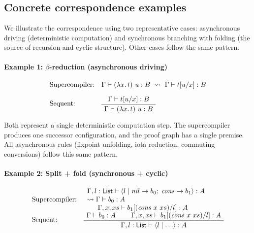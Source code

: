 \subsection{Concrete correspondence examples}
\label{sec:sc-examples}

We illustrate the correspondence using two representative cases: asynchronous driving (deterministic computation) and synchronous branching with folding (the source of recursion and cyclic structure). Other cases follow the same pattern.

\paragraph{Example 1: $\beta$-reduction (asynchronous driving)}

\[
\begin{array}{ll}
\text{Supercompiler:} & \Gamma \vdash (\lambda x.\,t)~u : B \;\leadsto\; \Gamma \vdash t[u/x] : B \\[1em]
\text{Sequent:} &
\AxiomC{$\Gamma \vdash t[u/x] : B$}
\UnaryInfC{$\Gamma \vdash (\lambda x.\,t)~u : B$}
\DisplayProof
\end{array}
\]

Both represent a single deterministic computation step. The supercompiler produces one successor configuration, and the proof graph has a single premise. All asynchronous rules (fixpoint unfolding, iota reduction, commuting conversions) follow this same pattern.

\paragraph{Example 2: Split + fold (synchronous + cyclic)}

\[
\begin{array}{ll}
\text{Supercompiler:} &
\begin{array}{l}
\Gamma, l : \mathsf{List} \vdash \langle l \mid \mathit{nil}\to b_0;\; \mathit{cons}\to b_1 \rangle : A \\
\leadsto \Gamma \vdash b_0 : A \\
\phantom{\leadsto}\;\; \Gamma, x, xs \vdash b_1[(\mathit{cons}~x~xs)/l] : A
\end{array} \\[1em]
\text{Sequent:} &
\AxiomC{$\Gamma \vdash b_0 : A$}
\AxiomC{$\Gamma, x, xs \vdash b_1[(\mathit{cons}~x~xs)/l] : A$}
\BinaryInfC{$\Gamma, l : \mathsf{List} \vdash \langle l \mid \ldots \rangle : A$}
\DisplayProof
\end{array}
\]

